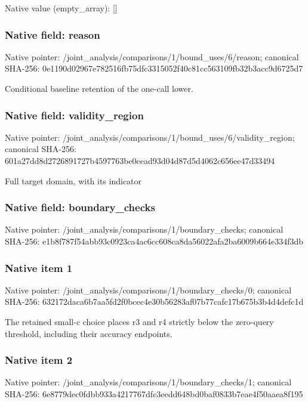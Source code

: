 \documentclass[10pt,a4paper]{article}
\begin{document}
Native value (empty\_\allowbreak{}array): []

\subsubsection{Native field: reason}
Native pointer: /joint\_\allowbreak{}analysis/comparisons/1/bound\_\allowbreak{}uses/6/reason; canonical SHA-256: 0e1190d02967e782516fb75dfc3315052f40c81cc563109fb32b3acc9d6725d7

\begingroup\raggedright\sloppy Conditional baseline retention of the one-call lower.\par\endgroup

\subsubsection{Native field: validity\_\allowbreak{}region}
Native pointer: /joint\_\allowbreak{}analysis/comparisons/1/bound\_\allowbreak{}uses/6/validity\_\allowbreak{}region; canonical SHA-256: 601a27dd8d2726891727b4597763be0eead93d04d87d5d4062c656ee47d33494

\begingroup\raggedright\sloppy Full target domain,\allowbreak{} with its indicator\par\endgroup

\subsubsection{Native field: boundary\_\allowbreak{}checks}
Native pointer: /joint\_\allowbreak{}analysis/comparisons/1/boundary\_\allowbreak{}checks; canonical SHA-256: e1b8f787f54abb93c0923ca4ac6cc608ca8da56022afa2ba6009b664e334f3db

\subsubsection{Native item 1}
Native pointer: /joint\_\allowbreak{}analysis/comparisons/1/boundary\_\allowbreak{}checks/0; canonical SHA-256: 632172daca6b7aa5fd2f0bcec4e30b56283af07b77cafc17b675b3b4d4defc1d

\begingroup\raggedright\sloppy The retained small-c choice places r3 and r4 strictly below the zero-query threshold,\allowbreak{} including their accuracy endpoints.\par\endgroup

\subsubsection{Native item 2}
Native pointer: /joint\_\allowbreak{}analysis/comparisons/1/boundary\_\allowbreak{}checks/1; canonical SHA-256: 6e8779dec0fdbb933a4217767dfc3eedd648bd0baf0833b7eae4f50aaea8f195
\end{document}
